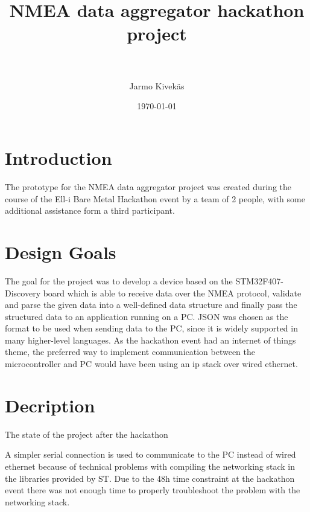 \documentclass[paper=a4, fontsize=12pt]{article} %
\title{	
\normalfont \normalsize 
\textsc{} \\ [25pt] %
\horrule{0.5pt} \\[0.4cm] %
\huge NMEA data aggregator hackathon project \\ %
\horrule{0.5pt} \\[0.5cm] %
}
\author{Jarmo Kivekäs} %
\date{\normalsize\today} %
\numberwithin{equation}{section}
\numberwithin{figure}{section}
\numberwithin{table}{section}
\begin{document}
\maketitle %

\tableofcontents


\section{Introduction} %
\label{sec:introduction}

The prototype for the NMEA data aggregator project was created during the course of the Ell-i Bare Metal Hackathon event by a team of 2 people, with some additional assistance form a third participant.


\section{Design Goals} %
\label{sec:reasoning_and_goals}

The goal for the project was to develop a device based on the STM32F407-Discovery board which is able to receive data over the NMEA protocol, validate and parse the given data into a well-defined data structure and finally pass the structured data to an application running on a PC. JSON was chosen as the format to be used when sending data to the PC, since it is widely supported in many higher-level languages. As the hackathon event had an internet of things theme, the preferred way to implement communication between the microcontroller and PC would have been using an ip stack over wired ethernet.

\section{Decription} %
\label{sec:decription}

The state of the project after the hackathon 

A simpler serial connection is used to communicate to the PC instead of wired ethernet because of technical problems with compiling the networking stack in the libraries provided by ST. Due to the 48h time constraint at the hackathon event there was not enough time to properly troubleshoot the problem with the networking stack.

\end{document}
